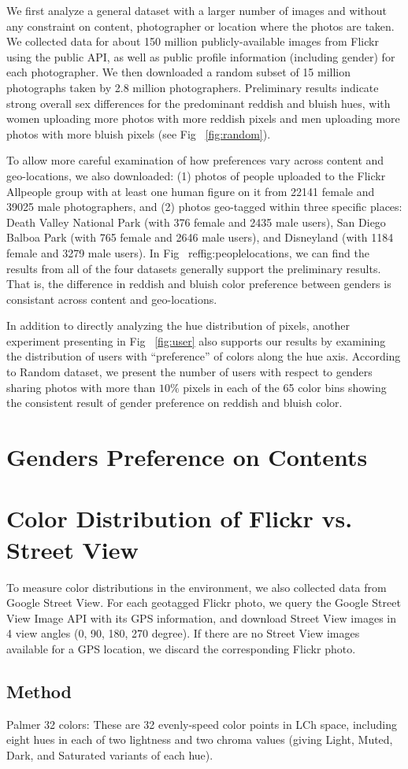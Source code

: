 We first analyze a general dataset with a larger number of images and without any constraint on content, photographer or location where the photos are taken.
We collected data for about 150 million publicly-available images from Flickr using the public API, as well as public profile information (including gender) for each photographer. We then downloaded a random subset of 15 million photographs taken by 2.8 million photographers.
Preliminary results indicate strong overall sex differences for the predominant reddish and bluish hues, with women uploading more photos with more reddish pixels and men uploading more photos with more bluish pixels (see Fig ~\ref{fig:random}).  

To allow more careful examination of how preferences vary across content and geo-locations, we also downloaded: (1) photos of people uploaded to the Flickr Allpeople group 
with at least one human figure on it from 22141 female and 39025 male photographers, and (2) photos geo-tagged within three specific places: Death Valley National Park (with 376 female and 2435 male users), San Diego Balboa Park (with 765 female and 2646 male users), and Disneyland (with 1184 female and 3279 male users).
In Fig ~ref{fig:peoplelocations}, we can find the results from all of the four datasets generally support the preliminary results. 
That is, the difference in reddish and bluish color preference between genders is consistant across content and geo-locations.

In addition to directly analyzing the hue distribution of pixels, another experiment presenting in Fig ~\ref{fig:user} also supports our results by examining the distribution of users with ``preference'' of colors along the hue axis.
According to Random dataset, we present the number of users with respect to genders sharing photos with more than $10\%$ pixels in each of the 65 color bins showing the consistent result of gender preference on reddish and bluish color.

\section{Genders Preference on Contents}



\section{Color Distribution of Flickr vs. Street View}
To measure color distributions in the environment, we also collected data from Google Street View. 
For each geotagged Flickr photo, we query the Google Street View Image API with its GPS information, and download Street View images in 4 view angles (0, 90, 180, 270 degree). If there are no Street View images available for a GPS location, we discard the corresponding Flickr photo.
\subsection{Method}
Palmer 32 colors: These are 32 evenly-speed color points in LCh space, including eight hues in each of two lightness and two chroma values (giving Light, Muted, Dark, and Saturated variants of each hue).


